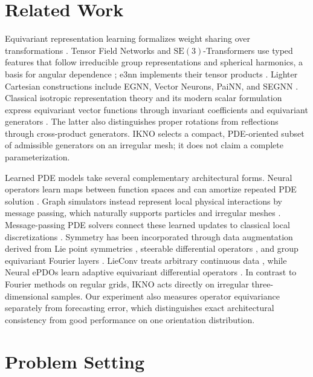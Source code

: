 \documentclass[mlmain]{jmlr}
\newcommand{\IKNO}{\textsc{IKNO}}
\begin{document}
\section{Related Work}
\label{sec:related}

Equivariant representation learning formalizes weight sharing over transformations
\citep{cohen2016group,bronstein2021geometric}. Tensor Field Networks and
$\mathrm{SE}(3)$-Transformers use typed features that follow irreducible group
representations and spherical harmonics, a basis for angular dependence
\citep{thomas2018tensor,fuchs2020se3}; e3nn implements their tensor
products \citep{geiger2022e3nn}. Lighter Cartesian constructions include EGNN,
Vector Neurons, PaiNN, and SEGNN
\citep{satorras2021en,deng2021vector,schutt2021painn,brandstetter2022segnn}.
Classical isotropic representation theory and its modern scalar formulation
express equivariant vector functions through invariant coefficients and
equivariant generators \citep{smith1971isotropic,villar2021scalars}. The latter
also distinguishes proper rotations from reflections through cross-product
generators. \IKNO{} selects a compact, PDE-oriented subset of admissible
generators on an irregular mesh; it does not claim a complete parameterization.

Learned PDE models take several complementary architectural forms. Neural
operators learn maps between function spaces and can amortize repeated
PDE solution \citep{li2021fno}. Graph simulators instead represent local
physical interactions by message passing, which naturally supports particles
and irregular meshes \citep{sanchez2020simulate,pfaff2021mesh}. Message-passing
PDE solvers connect these learned updates to classical local discretizations
\citep{brandstetter2022message}. Symmetry has been incorporated through data
augmentation derived from Lie point symmetries \citep{brandstetter2022lie},
steerable differential operators \citep{jenner2022steerable}, and group
equivariant Fourier layers \citep{helwig2023gfno}. LieConv treats arbitrary
continuous data \citep{finzi2020lieconv}, while Neural ePDOs learn adaptive
equivariant differential operators \citep{he2023epdo}. In contrast to Fourier
methods on regular grids, \IKNO{} acts directly on irregular three-dimensional
samples. Our experiment also measures operator equivariance separately from
forecasting error, which distinguishes exact architectural consistency from
good performance on one orientation distribution.

\section{Problem Setting}
\label{sec:problem}
\end{document}
